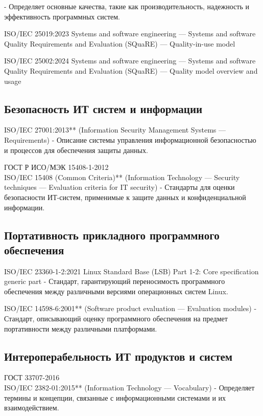      - Определяет основные качества, такие как производительность, надежность и эффективность программных систем.


ISO/IEC 25019:2023
Systems and software engineering — Systems and software Quality Requirements and Evaluation (SQuaRE) — Quality-in-use model

ISO/IEC 25002:2024
Systems and software engineering — Systems and software Quality Requirements and Evaluation (SQuaRE) — Quality model overview and usage

\subsection{Безопасность ИТ систем и информации}

ISO/IEC 27001:2013** (Information Security Management Systems — Requirements)
     - Описание системы управления информационной безопасностью и процессов для обеспечения защиты данных.

ГОСТ Р ИСО/МЭК 15408-1-2012\\
ISO/IEC 15408 (Common Criteria)** (Information Technology — Security techniques — Evaluation criteria for IT security)
     - Стандарты для оценки безопасности ИТ-систем, применимые к защите данных и конфиденциальной информации.

\subsection{Портативность прикладного программного обеспечения}

ISO/IEC 23360-1-2:2021
Linux Standard Base (LSB)
Part 1-2: Core specification generic part
     - Стандарт, гарантирующий переносимость программного обеспечения между различными версиями операционных систем Linux.

ISO/IEC 14598-6:2001** (Software product evaluation — Evaluation modules)
     - Стандарт, описывающий оценку программного обеспечения на предмет портативности между различными платформами.

\subsection{Интероперабельность ИТ продуктов и систем}

ГОСТ 33707-2016\\
ISO/IEC 2382-01:2015** (Information Technology — Vocabulary)
     - Определяет термины и концепции, связанные с информационными системами и их взаимодействием.

